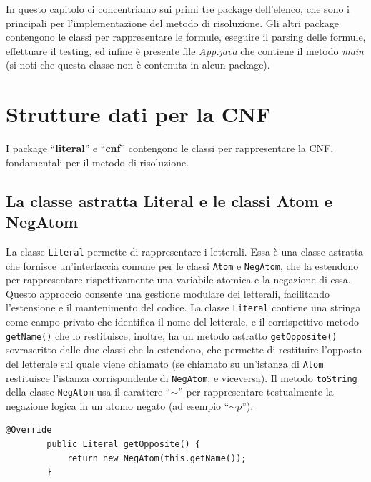 \documentclass[a4paper,12pt]{report}
\begin{document}
In questo capitolo ci concentriamo sui primi tre package dell'elenco, che sono i principali per l'implementazione del metodo di risoluzione. Gli altri package contengono le classi per rappresentare le formule, eseguire il parsing delle formule, effettuare il testing, ed infine è presente file \emph{App.java} che contiene il metodo \emph{main} (si noti che questa classe non è contenuta in alcun package).


\section{Strutture dati per la CNF}
I package ``\textbf{literal}'' e ``\textbf{cnf}'' contengono le classi per rappresentare la CNF, fondamentali per il metodo di risoluzione.

\subsection{La classe astratta Literal e le classi Atom e NegAtom}
La classe \texttt{Literal} permette di rappresentare i letterali. Essa è una classe astratta che fornisce un'interfaccia comune per le classi \texttt{Atom} e \texttt{NegAtom}, che la estendono per rappresentare rispettivamente una variabile atomica e la negazione di essa. Questo approccio consente una gestione modulare dei letterali, facilitando l'estensione e il mantenimento del codice. La classe \texttt{Literal} contiene una stringa come campo privato che identifica il nome del letterale, e il corrispettivo metodo \texttt{getName()} che lo restituisce; inoltre, ha un metodo astratto \texttt{getOpposite()} sovrascritto dalle due classi che la estendono, che permette di restituire l'opposto del letterale sul quale viene chiamato (se chiamato su un'istanza di \texttt{Atom} restituisce l'istanza corrispondente di \texttt{NegAtom}, e viceversa). Il metodo \texttt{toString} della classe \texttt{NegAtom} usa il carattere ``\textbf{$\sim $}'' per rappresentare testualmente la negazione logica in un atomo negato (ad esempio ``\emph{$\sim p$}'').

\begin{minipage}{\linewidth}
    \begin{lstlisting}[title={metodo getOpposite sovrascritto dalla classe Atom}]
        @Override
        public Literal getOpposite() {
            return new NegAtom(this.getName());
        }
    \end{lstlisting}
\end{minipage}
\end{document}

